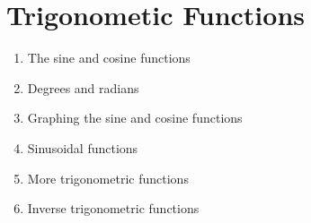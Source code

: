 
\chapter{Trigonometic Functions}

\begin{enumerate}
\item The sine and cosine functions

\item Degrees and radians

\item Graphing the sine and cosine functions

\item Sinusoidal functions

\item More trigonometric functions

\item Inverse trigonometric functions
\end{enumerate}
